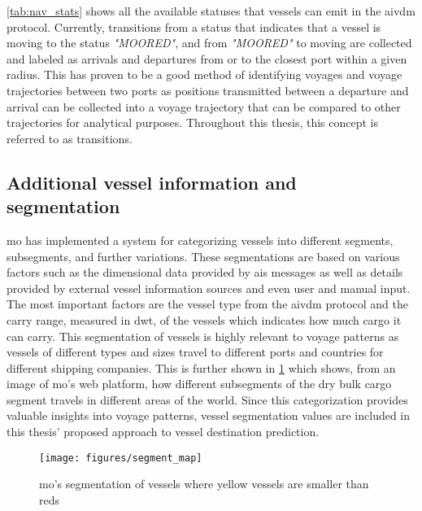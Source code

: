 \cref{tab:nav_stats} shows all the available statuses that vessels can emit in the \gls{aivdm} protocol. Currently, transitions from a status that indicates that a vessel is moving to the status \textit{"MOORED"}, and from \textit{"MOORED"} to moving are collected and labeled as arrivals and departures from or to the closest port within a given radius. This has proven to be a good method of identifying voyages and voyage trajectories between two ports as positions transmitted between a departure and arrival can be collected into a voyage trajectory that can be compared to other trajectories for analytical purposes. Throughout this thesis, this concept is referred to as \glspl{transition}.

\subsection{Additional vessel information and segmentation}
\label{sec:vessel_info_segments}

\acrshort{mo} has implemented a system for categorizing vessels into different segments, subsegments, and further variations. These segmentations are based on various factors such as the dimensional data provided by \acrshort{ais} messages as well as details provided by external vessel information sources and even user and manual input. The most important factors are the vessel type from the \gls{aivdm} protocol and the carry range, measured in \acrshort{dwt}, of the vessels which indicates how much cargo it can carry. This segmentation of vessels is highly relevant to voyage patterns as vessels of different types and sizes travel to different ports and countries for different shipping companies. This is further shown in \cref{fig:segment_map} which shows, from an image of \acrshort{mo}'s web platform, how different subsegments of the dry bulk cargo segment travels in different areas of the world. Since this categorization provides valuable insights into voyage patterns, vessel segmentation values are included in this thesis' proposed approach to vessel destination prediction.

\begin{figure}[htbp]
    \centering
    \texttt{[image: figures/segment\_map]}
    \caption{\acrfull{mo}’s segmentation of vessels where yellow vessels are smaller than reds}
    \label{fig:segment_map}
\end{figure}

